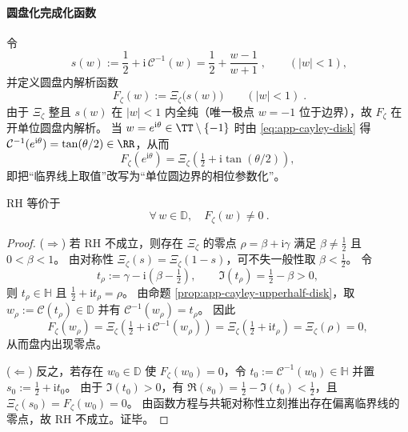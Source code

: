 \paragraph{圆盘化完成化函数}
令
\begin{equation}\label{eq:app-s-of-w}
\boxed{\;
s(w):=\frac12+\mathrm{i}\,\mathcal{C}^{-1}(w)
=\frac12+\frac{w-1}{w+1}\; },
\qquad (|w|<1),
\end{equation}
并定义圆盘内解析函数
\begin{equation}\label{eq:app-Fzeta-disk}
\boxed{\;
F_{\zeta}(w):=\Xi_{\zeta}\!\bigl(s(w)\bigr)\qquad(|w|<1)\; }.
\end{equation}
由于 \(\Xi_{\zeta}\) 整且 \(s(w)\) 在 \(|w|<1\) 内全纯（唯一极点 \(w=-1\) 位于边界），故 \(F_{\zeta}\) 在开单位圆盘内解析。
当 \(w=e^{\mathrm{i}\theta}\in\TT\setminus\{-1\}\) 时由 \eqref{eq:app-cayley-disk} 得 \(\mathcal{C}^{-1}(e^{\mathrm{i}\theta})=\tan(\theta/2)\in\RR\)，从而
\begin{equation}\label{eq:app-Fzeta-boundary}
F_{\zeta}(e^{\mathrm{i}\theta})=\Xi_{\zeta}\!\left(\tfrac12+\mathrm{i}\tan(\theta/2)\right),
\end{equation}
即把“临界线上取值”改写为“单位圆边界的相位参数化”。

\begin{theorem}\label{thm:app-rh-iff-disk-zero-free}
RH 等价于
\[
\boxed{\ \forall\,w\in\mathbb{D},\quad F_{\zeta}(w)\neq 0\ }.
\]
\end{theorem}
\begin{proof}
(\(\Rightarrow\)) 若 RH 不成立，则存在 \(\Xi_{\zeta}\) 的零点 \(\rho=\beta+\mathrm{i}\gamma\) 满足 \(\beta\neq \tfrac12\) 且 \(0<\beta<1\)。
由对称性 \(\Xi_{\zeta}(s)=\Xi_{\zeta}(1-s)\)，可不失一般性取 \(\beta<\tfrac12\)。
令
\[
t_{\rho}:=\gamma-\mathrm{i}\left(\beta-\tfrac12\right),
\qquad
\Im(t_{\rho})=\tfrac12-\beta>0,
\]
则 \(t_{\rho}\in\mathbb{H}\) 且 \( \tfrac12+\mathrm{i}t_{\rho}=\rho\)。
由命题 \ref{prop:app-cayley-upperhalf-disk}，取 \(w_{\rho}:=\mathcal{C}(t_{\rho})\in\mathbb{D}\) 并有 \(\mathcal{C}^{-1}(w_{\rho})=t_{\rho}\)。
因此
\[
F_{\zeta}(w_{\rho})
=\Xi_{\zeta}\!\left(\tfrac12+\mathrm{i}\,\mathcal{C}^{-1}(w_{\rho})\right)
=\Xi_{\zeta}\!\left(\tfrac12+\mathrm{i}t_{\rho}\right)
=\Xi_{\zeta}(\rho)
=0,
\]
从而盘内出现零点。

(\(\Leftarrow\)) 反之，若存在 \(w_0\in\mathbb{D}\) 使 \(F_{\zeta}(w_0)=0\)，令 \(t_0:=\mathcal{C}^{-1}(w_0)\in\mathbb{H}\) 并置 \(s_0:=\tfrac12+\mathrm{i}t_0\)。
由于 \(\Im(t_0)>0\)，有 \(\Re(s_0)=\tfrac12-\Im(t_0)<\tfrac12\)，且
\(
\Xi_{\zeta}(s_0)=F_{\zeta}(w_0)=0
\)。
由函数方程与共轭对称性立刻推出存在偏离临界线的零点，故 RH 不成立。证毕。
\end{proof}

